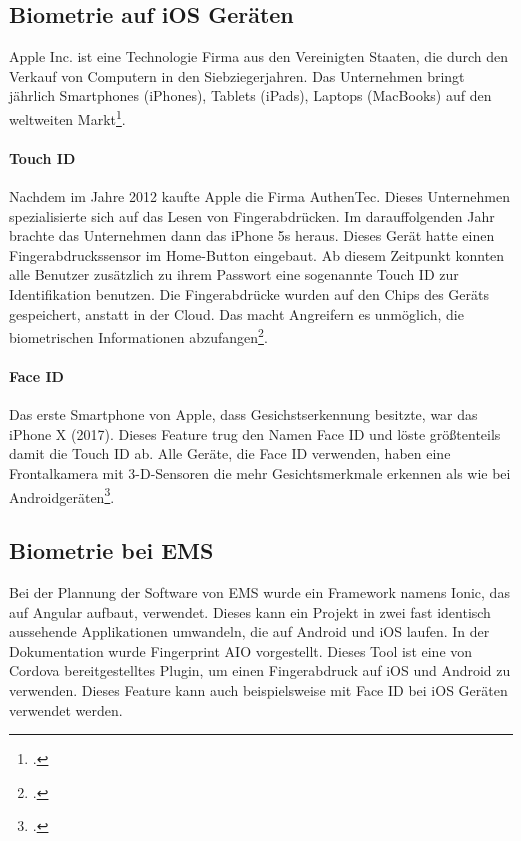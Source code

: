 \subsection{Biometrie auf iOS Geräten}
Apple Inc. ist eine Technologie Firma aus den Vereinigten Staaten, die durch den Verkauf von Computern in den Siebziegerjahren. Das Unternehmen bringt jährlich Smartphones (iPhones), Tablets (iPads), Laptops (MacBooks) auf den weltweiten Markt\footcite{apple}.
\paragraph{Touch ID}
Nachdem im Jahre 2012 kaufte Apple die Firma AuthenTec. Dieses Unternehmen spezialisierte sich auf das Lesen von Fingerabdrücken.
Im darauffolgenden Jahr brachte das Unternehmen dann das iPhone 5s heraus. Dieses Gerät hatte einen Fingerabdruckssensor im Home-Button eingebaut. Ab diesem Zeitpunkt konnten alle Benutzer zusätzlich zu ihrem Passwort eine sogenannte Touch ID zur Identifikation benutzen.
Die Fingerabdrücke wurden auf den Chips des Geräts gespeichert, anstatt in der Cloud. Das macht Angreifern es unmöglich, die biometrischen Informationen abzufangen\footcite{touchid}.

\paragraph{Face ID}
Das erste Smartphone von Apple, dass Gesichstserkennung besitzte, war das iPhone X (2017). Dieses Feature trug den Namen Face ID und löste größtenteils damit die Touch ID ab.
Alle Geräte, die Face ID verwenden, haben eine Frontalkamera mit 3-D-Sensoren die mehr Gesichtsmerkmale erkennen als wie bei Androidgeräten\footcite{faceid}.

\subsection{Biometrie bei EMS}
Bei der Plannung der Software von EMS wurde ein Framework namens Ionic, das auf Angular aufbaut, verwendet. Dieses kann ein Projekt in zwei fast identisch aussehende Applikationen umwandeln, die auf Android und iOS laufen.
In der Dokumentation wurde Fingerprint AIO vorgestellt. Dieses Tool ist eine von Cordova bereitgestelltes Plugin, um einen Fingerabdruck auf iOS und Android zu verwenden.
Dieses Feature kann auch beispielsweise mit Face ID bei iOS Geräten verwendet werden.

